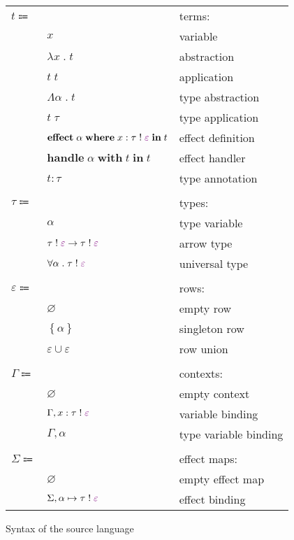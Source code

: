 \documentclass[12pt]{article}
\newcommand\anno[2]{#1 : #2}
\newcommand\term{t}
\newcommand\eVar{x}
\newcommand\eAbs[2]{\lambda #1 \; . \; #2}
\newcommand\eApp[2]{#1 \; #2}
\newcommand\eTAbs[2]{\Lambda #1 \; . \; #2}
\newcommand\eTApp[2]{#1 \; #2}
\newcommand\eHandle[3]{\textbf{handle} \; #1 \; \textbf{with} \; #2 \; \textbf{in} \; #3}
\newcommand\eEffect[5]{\textbf{effect} \; #1 \; \textbf{where} \; \anno{#2}{\tEmbellished{#3}{#4}} \; \textbf{in} \; #5}
\newcommand\eAnno[2]{\anno{#1}{#2}}
\newcommand\type{\tau}
\newcommand\tVar{\alpha}
\newcommand\tArrow[4]{\tEmbellished{#1}{#2} \rightarrow \tEmbellished{#3}{#4}}
\newcommand\tForall[3]{\forall #1 \; . \; \tEmbellished{#2}{#3}}
\newcommand\tEmbellished[2]{#1 \; ! \; \textcolor{violet}{#2}}
\newcommand\row{\varepsilon}
\newcommand\rEmpty{\varnothing}
\newcommand\rSingleton[1]{\left\{ #1 \right\}}
\newcommand\rUnion[2]{#1 \cup #2}
\newcommand\context{\Gamma}
\newcommand\cEmpty{\varnothing}
\newcommand\cTExtend[4]{#1, \anno{#2}{\tEmbellished{#3}{#4}}}
\newcommand\cKExtend[2]{#1, #2}
\newcommand\effectMap{\Sigma}
\newcommand\emEmpty{\varnothing}
\newcommand\emExtend[4]{#1, #2 \mapsto \tEmbellished{#3}{#4}}
\begin{document}
        \begin{figure}[H]
          \begin{mdframed}[backgroundcolor=none]
            \begin{center}
              \begin{tabular}{l l l}
                $\term \Coloneqq$ & & terms: \\
                & $\eVar$ & variable \\
                & $\eAbs{\eVar}{\term}$ & abstraction \\
                & $\eApp{\term}{\term}$ & application \\
                & $\eTAbs{\tVar}{\term}$ & type abstraction \\
                & $\eTApp{\term}{\type}$ & type application \\
                & $\eEffect{\tVar}{\eVar}{\type}{\row}{\term}$ & effect definition \\
                & $\eHandle{\tVar}{\term}{\term}$ & effect handler \\
                & $\eAnno{\term}{\type}$ & type annotation \\
                \\
                $\type \Coloneqq$ & & types: \\
                & $\tVar$ & type variable \\
                & $\tArrow{\type}{\row}{\type}{\row}$ & arrow type \\
                & $\tForall{\tVar}{\type}{\row}$ & universal type \\
                \\
                $\row \Coloneqq$ & & rows: \\
                & $\rEmpty$ & empty row \\
                & $\rSingleton{\tVar}$ & singleton row \\
                & $\rUnion{\row}{\row}$ & row union \\
                \\
                $\context \Coloneqq$ & & contexts: \\
                & $\cEmpty$ & empty context \\
                & $\cTExtend{\context}{\eVar}{\type}{\row}$ & variable binding \\
                & $\cKExtend{\context}{\tVar}$ & type variable binding \\
                \\
                $\effectMap \Coloneqq$ & & effect maps: \\
                & $\emEmpty$ & empty effect map \\
                & $\emExtend{\effectMap}{\tVar}{\type}{\row}$ & effect binding \\
              \end{tabular}
            \end{center}

            \caption{Syntax of the source language}\label{fig:source_syntax}
          \end{mdframed}
        \end{figure}
\end{document}
